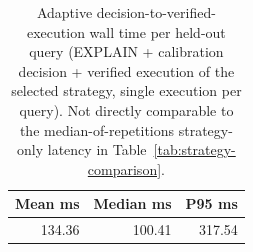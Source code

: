 \begin{table}[t]
\centering
\caption{Adaptive decision-to-verified-execution wall time per held-out query (EXPLAIN + calibration decision + verified execution of the selected strategy, single execution per query). Not directly comparable to the median-of-repetitions strategy-only latency in Table~\ref{tab:strategy-comparison}.}
\label{tab:decision-overhead}
\small
\begin{tabular}{rrr}
\toprule
Mean ms & Median ms & P95 ms \\
\midrule
134.36 & 100.41 & 317.54 \\
\bottomrule
\end{tabular}
\end{table}
